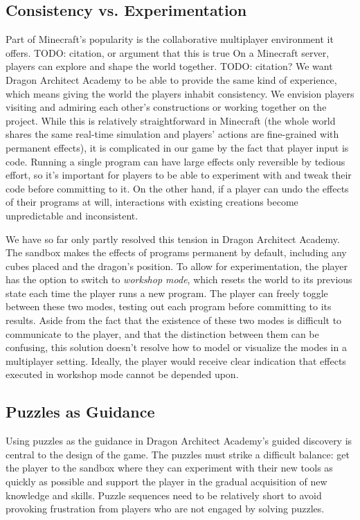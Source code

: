 \documentclass{sig-alternate}
\newcommand{\TODO}[1]{{\color{red} TODO: #1}}
\newcommand{\gametitle}{{\color{RoyalPurple} Dragon Architect Academy}}
\begin{document}
\subsection{Consistency vs. Experimentation}
Part of Minecraft's popularity is the collaborative multiplayer environment it offers. \TODO{citation, or argument that this is true}
On a Minecraft server, players can explore and shape the world together. \TODO{citation?} 
We want \gametitle{} to be able to provide the same kind of experience, which means giving the world the players inhabit consistency. 
We envision players visiting and admiring each other's constructions or working together on the project. 
While this is relatively straightforward in Minecraft (the whole world shares the same real-time simulation and players' actions are fine-grained with permanent effects), it is complicated in our game by the fact that player input is code. 
Running a single program can have large effects only reversible by tedious effort, so it's important for players to be able to experiment with and tweak their code before committing to it. 
On the other hand, if a player can undo the effects of their programs at will, interactions with existing creations become unpredictable and inconsistent. 

We have so far only partly resolved this tension in \gametitle{}. 
The sandbox makes the effects of programs permanent by default, including any cubes placed and the dragon's position.
To allow for experimentation, the player has the option to switch to \emph{workshop mode}, which resets the world to its previous state each time the player runs a new program. 
The player can freely toggle between these two modes, testing out each program before committing to its results. 
Aside from the fact that the existence of these two modes is difficult to communicate to the player, and that the distinction between them can be confusing, this solution doesn't resolve how to model or visualize the modes in a multiplayer setting. 
Ideally, the player would receive clear indication that effects executed in workshop mode cannot be depended upon.

\subsection{Puzzles as Guidance}
Using puzzles as the guidance in \gametitle{}'s guided discovery is central to the design of the game. 
The puzzles must strike a difficult balance: get the player to the sandbox where they can experiment with their new tools as quickly as possible and support the player in the gradual acquisition of new knowledge and skills. 
Puzzle sequences need to be relatively short to avoid provoking frustration from players who are not engaged by solving puzzles. 
\end{document}
